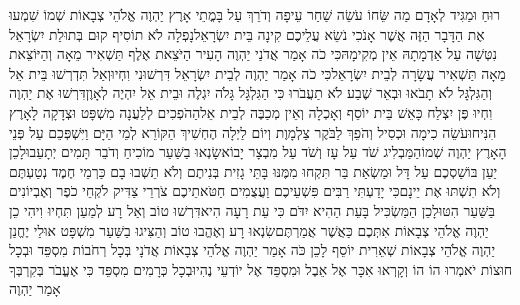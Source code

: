 \documentclass[../main/main.tex]{subfiles}
\begin{document}
\begin{multicols*}{\ncols}
רוּחַ וּמַגִּיד לְאָדָם מַה שֵּׂחוֹ עֹשֵׂה שַׁחַר עֵיפָה וְדֹרֵךְ עַל בָּמֳתֵי אָרֶץ יַהְוֶה אֱלֹהֵי צְבָאוֹת שְׁמוֹ \ClosedSection{}שִׁמְעוּ אֶת הַדָּבָר הַזֶּה אֲשֶׁר אָנֹכִי נֹשֵׂא עֲלֵיכֶם קִינָה בֵּית יִשְׂרָאֵל\PreVerseSpace{}נָפְלָה לֹא תוֹסִיף קוּם בְּתוּלַת יִשְׂרָאֵל נִטְּשָׁה עַל אַדְמָתָהּ אֵין מְקִימָהּ\PreVerseSpace{}כִּי כֹה אָמַר אֲדֹנַי יַהְוֶה הָעִיר הַיֹּצֵאת אֶלֶף תַּשְׁאִיר מֵאָה וְהַיּוֹצֵאת מֵאָה תַּשְׁאִיר עֲשָׂרָה לְבֵית יִשְׂרָאֵל\PreVerseSpace{}כִּי כֹה אָמַר יַהְוֶה לְבֵית יִשְׂרָאֵל דִּרְשׁוּנִי וִחְיוּ\PreVerseSpace{}וְאַל תִּדְרְשׁוּ בֵּית אֵל וְהַגִּלְגָּל לֹא תָבֹאוּ וּבְאֵר שֶׁבַע לֹא תַעֲבֹרוּ כִּי הַגִּלְגָּל גָּלֹה יִגְלֶה וּבֵית אֵל יִהְיֶה לְאָוֶן\PreVerseSpace{}דִּרְשׁוּ אֶת יַהְוֶה וִחְיוּ פֶּן יִצְלַח כָּאֵשׁ בֵּית יוֹסֵף וְאָכְלָה וְאֵין מְכַבֶּה לְבֵית אֵל\PreVerseSpace{}הַהֹפְכִים לְלַעֲנָה מִשְׁפָּט וּצְדָקָה לָאָרֶץ הִנִּיחוּ\PreVerseSpace{}עֹשֵׂה כִימָה וּכְסִיל וְהֹפֵךְ לַבֹּקֶר צַלְמָוֶת וְיוֹם לַיְלָה הֶחְשִׁיךְ הַקּוֹרֵא לְמֵי הַיָּם וַיִּשְׁפְּכֵם עַל פְּנֵי הָאָרֶץ יַהְוֶה שְׁמוֹ\PreVerseSpace{}הַמַּבְלִיג שֹׁד עַל עָז וְשֹׁד עַל מִבְצָר יָבוֹא\PreVerseSpace{}שָׂנְאוּ בַשַּׁעַר מוֹכִיחַ וְדֹבֵר תָּמִים יְתָעֵבוּ\PreVerseSpace{}לָכֵן יַעַן בּוֹשַׁסְכֶם עַל דָּל וּמַשְׂאַת בַּר תִּקְחוּ מִמֶּנּוּ בָּתֵּי גָזִית בְּנִיתֶם וְלֹא תֵשְׁבוּ בָם כַּרְמֵי חֶמֶד נְטַעְתֶּם וְלֹא תִשְׁתּוּ אֶת יֵינָם\PreVerseSpace{}כִּי יָדַעְתִּי רַבִּים פִּשְׁעֵיכֶם וַעֲצֻמִים חַטֹּאתֵיכֶם צֹרְרֵי צַדִּיק לֹקְחֵי כֹפֶר וְאֶבְיוֹנִים בַּשַּׁעַר הִטּוּ\PreVerseSpace{}לָכֵן הַמַּשְׂכִּיל בָּעֵת הַהִיא יִדֹּם כִּי עֵת רָעָה הִיא\PreVerseSpace{}דִּרְשׁוּ טוֹב וְאַל רָע לְמַעַן תִּחְיוּ וִיהִי כֵן יַהְוֶה אֱלֹהֵי צְבָאוֹת אִתְּכֶם כַּאֲשֶׁר אֲמַרְתֶּם\PreVerseSpace{}שִׂנְאוּ רָע וְאֶהֱבוּ טוֹב וְהַצִּיגוּ בַשַּׁעַר מִשְׁפָּט אוּלַי יֶחֱנַן יַהְוֶה אֱלֹהֵי צְבָאוֹת שְׁאֵרִית יוֹסֵף \ClosedSection{}לָכֵן כֹּה אָמַר יַהְוֶה אֱלֹהֵי צְבָאוֹת אֲדֹנָי בְּכָל רְחֹבוֹת מִסְפֵּד וּבְכָל חוּצוֹת יֹאמְרוּ הוֹ הוֹ וְקָרְאוּ אִכָּר אֶל אֵבֶל וּמִסְפֵּד אֶל יוֹדְעֵי נֶהִי\PreVerseSpace{}וּבְכָל כְּרָמִים מִסְפֵּד כִּי אֶעֱבֹר בְּקִרְבְּךָ אָמַר יַהְוֶה\OpenSection{}\par

\end{multicols*}
\end{document}

